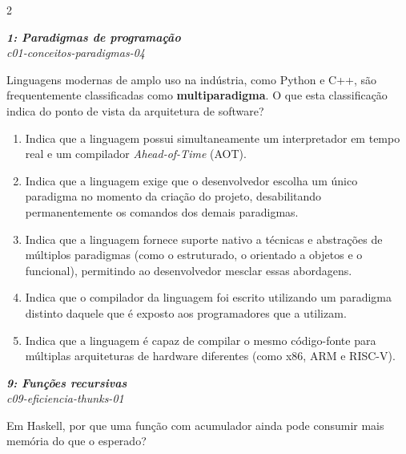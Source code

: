 \documentclass[a4paper,10pt,brazil]{article}
\begin{document}
\begin{multicols}{2}
\begin{enumerate}
\end{enumerate}

\begin{flushright}
  \footnotesize
  \textit{\textbf{1: Paradigmas de programação}}\\
  \textit{c01-conceitos-paradigmas-04}\\

\end{flushright}
Linguagens modernas de amplo uso na indústria, como Python e C++, são frequentemente classificadas como \textbf{multiparadigma}. O que esta classificação indica do ponto de vista da arquitetura de software?

\begin{enumerate}
  \item Indica que a linguagem possui simultaneamente um interpretador em tempo real e um compilador \emph{Ahead-of-Time} (AOT).

  \item Indica que a linguagem exige que o desenvolvedor escolha um único paradigma no momento da criação do projeto, desabilitando permanentemente os comandos dos demais paradigmas.

  \item Indica que a linguagem fornece suporte nativo a técnicas e abstrações de múltiplos paradigmas (como o estruturado, o orientado a objetos e o funcional), permitindo ao desenvolvedor mesclar essas abordagens.

  \item Indica que o compilador da linguagem foi escrito utilizando um paradigma distinto daquele que é exposto aos programadores que a utilizam.

  \item Indica que a linguagem é capaz de compilar o mesmo código-fonte para múltiplas arquiteturas de hardware diferentes (como x86, ARM e RISC-V).


\end{enumerate}

\begin{flushright}
  \footnotesize
  \textit{\textbf{9: Funções recursivas}}\\
  \textit{c09-eficiencia-thunks-01}\\

\end{flushright}
Em Haskell, por que uma função com acumulador ainda pode consumir mais memória do que o esperado?


\end{multicols}
\end{document}
